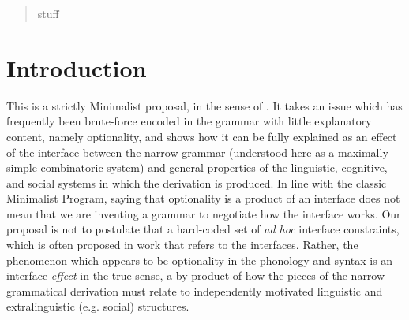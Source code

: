 \author{Josef Fruehwald \& Joel C. Wallenberg}



\date{Received: date / Accepted: date}


\maketitle

\begin{abstract}
stuff
\end{abstract}


\section{Introduction}
\label{intro}

This is a strictly Minimalist proposal, in the sense of \citet{chomsky1993, chomsky1995, chomsky1998,chomsky2001}.
It takes an issue which has frequently been brute-force encoded in the grammar with little explanatory content, namely optionality, and shows how it can be fully explained as an effect of the interface between the narrow grammar (understood here as a maximally simple combinatoric system) and general properties of the linguistic, cognitive, and social systems in which the derivation is produced.
In line with the classic Minimalist Program, saying that optionality is a product of an interface does not mean that we are inventing a grammar to negotiate how the interface works.
Our proposal is not to postulate that a hard-coded set of \textsl{ad hoc} interface constraints, which is often proposed in work that refers to the interfaces.
Rather, the phenomenon which appears to be optionality in the phonology and syntax is an interface \textsl{effect} in the true sense, a by-product of how the pieces of the narrow grammatical derivation must relate to independently motivated linguistic and extralinguistic (e.g. social) structures. 

